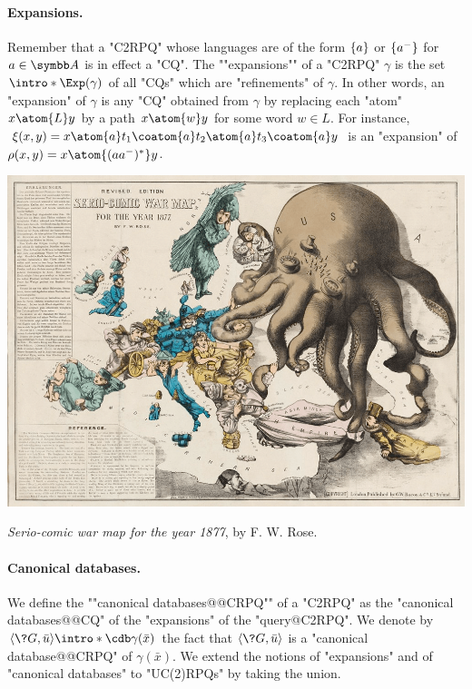 \paragraph*{Expansions.}
Remember that a "C2RPQ" whose languages are
of the form $\{a\}$ or $\{a^-\}$ for $a \in \A$ is in effect a "CQ".
The \AP""expansions"" of a "C2RPQ" $\gamma$ is the set $\intro*\Exp(\gamma)$ of all "CQs" which are "refinements" of $\gamma$.
In other words, an "expansion" of $\gamma$ is any "CQ" obtained from $\gamma$
by replacing each "atom" $x \atom{L} y$ by a path $x \atom{w} y$ for some
word $w \in L$.
For instance, $\xi(x,y) = x \atom{a} t_1 \coatom{a} t_2 \atom{a} t_3 \coatom{a} y$
is an "expansion" of $\rho(x,y) = x \atom{(aa^-)^*} y$.
\begin{marginfigure}[-4em]
    \centering
    \includegraphics[width=\linewidth]{fig/prelim-db/Russia.png}
    \caption{\emph{Serio-comic war map for the year 1877}, by F. W. Rose.}
\end{marginfigure}

\paragraph{Canonical databases.}
We define the \AP""canonical databases@@CRPQ"" of a "C2RPQ" as the "canonical databases@@CQ"
of the "expansions" of the "query@C2RPQ". We denote by
\AP$\tup{\?G,\bar u} \intro*\cdb \gamma(\bar x)$
the fact that $\tup{\?G,\bar u}$ is a "canonical database@@CRPQ" of $\gamma(\bar x)$.
We extend the notions of "expansions" and of "canonical databases" to "UC(2)RPQs" by
taking the union.

